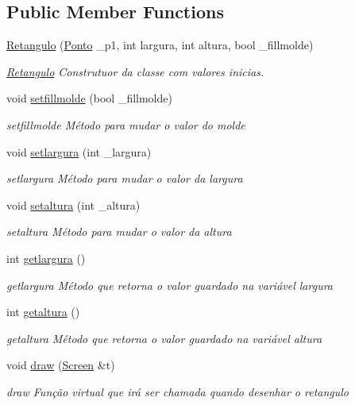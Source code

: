 \subsection*{Public Member Functions}
\begin{DoxyCompactItemize}
\item 
\mbox{\hyperlink{class_retangulo_a2ffbe31f15ad438225568f3e6d246e62}{Retangulo}} (\mbox{\hyperlink{class_ponto}{Ponto}} \+\_\+p1, int largura, int altura, bool \+\_\+fillmolde)
\begin{DoxyCompactList}\small\item\em \mbox{\hyperlink{class_retangulo}{Retangulo}} Construtuor da classe com valores inicias. \end{DoxyCompactList}\item 
void \mbox{\hyperlink{class_retangulo_a6dec6e7cba5c6de8834b00599ee1e150}{setfillmolde}} (bool \+\_\+fillmolde)
\begin{DoxyCompactList}\small\item\em setfillmolde Método para mudar o valor do molde \end{DoxyCompactList}\item 
void \mbox{\hyperlink{class_retangulo_afaaf315f9be859d0d83bae99baf645cb}{setlargura}} (int \+\_\+largura)
\begin{DoxyCompactList}\small\item\em setlargura Método para mudar o valor da largura \end{DoxyCompactList}\item 
void \mbox{\hyperlink{class_retangulo_aa4c2a5395874545b17c28743a4362a6f}{setaltura}} (int \+\_\+altura)
\begin{DoxyCompactList}\small\item\em setaltura Método para mudar o valor da altura \end{DoxyCompactList}\item 
int \mbox{\hyperlink{class_retangulo_a44414c2c20da988fec6ec12722ae95dc}{getlargura}} ()
\begin{DoxyCompactList}\small\item\em getlargura Método que retorna o valor guardado na variável largura \end{DoxyCompactList}\item 
int \mbox{\hyperlink{class_retangulo_a42d313847d429dda0869873a7b0e47a1}{getaltura}} ()
\begin{DoxyCompactList}\small\item\em getaltura Método que retorna o valor guardado na variável altura \end{DoxyCompactList}\item 
void \mbox{\hyperlink{class_retangulo_ac088dd6d3f4f3d3f80363a868c2e74f1}{draw}} (\mbox{\hyperlink{class_screen}{Screen}} \&t)
\begin{DoxyCompactList}\small\item\em draw Função virtual que irá ser chamada quando desenhar o retangulo \end{DoxyCompactList}\end{DoxyCompactItemize}
